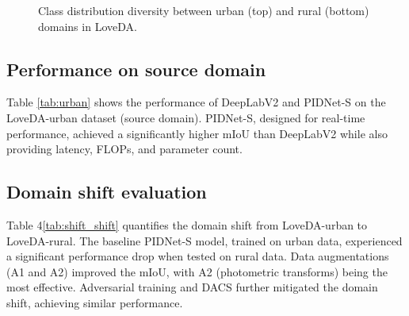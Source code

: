 \documentclass{article}
\begin{document}
\begin{multicols}{2}
\begin{figure}[H]
\begin{minipage}{1\linewidth}
			\end{minipage}
			\caption{Class distribution diversity between urban (top) and rural (bottom) domains in LoveDA.}  
			\label{fig:class_div}  

		\end{figure}


		\subsection{Performance on source domain}
		Table \ref{tab:urban} shows the performance of DeepLabV2 and PIDNet-S on the LoveDA-urban dataset (source domain). PIDNet-S, designed for real-time performance, achieved a significantly higher mIoU than DeepLabV2 while also providing latency, FLOPs, and parameter count.


		\begin{table}[H]
			\centering
			\renewcommand{\arraystretch}{1.2} %
			\setlength{\tabcolsep}{6pt} %
			
			\caption{Performance comparison of different hyperparameter tuning.}
			\label{tab:urban}
		\end{table}




		\subsection{Domain shift evaluation}
		\small
		Table 4\ref{tab:shift_shift} quantifies the domain shift from LoveDA-urban to LoveDA-rural. The baseline PIDNet-S model, trained on urban data, experienced a significant performance drop when tested on rural data. Data augmentations (A1 and A2) improved the mIoU, with A2 (photometric transforms) being the most effective. Adversarial training and DACS further mitigated the domain shift, achieving similar performance.
		

\end{multicols}
\end{document}
